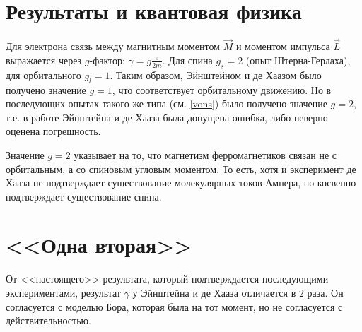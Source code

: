 \documentclass[a4paper]{article}
\begin{document}
\section*{Результаты и квантовая физика}
Для электрона связь между магнитным моментом $\vec{M}$ и моментом импульса $\vec{L}$ выражается через $g$-фактор: $\gamma=g\frac{e}{2m}$. Для спина $g_s=2$ (опыт Штерна-Герлаха), для орбитального $g_l=1$. Таким образом, Эйнштейном и де Хаазом было получено значение $g=1$, что соответствует орбитальному движению. Но в последующих опытах такого же типа (см. \ref*{vons}) было получено значение $g=2$, т.е. в работе Эйнштейна и де Хааза была допущена ошибка, либо неверно оценена погрешность.

Значение $g=2$ указывает на то, что магнетизм ферромагнетиков связан не с орбитальным, а со спиновым угловым моментом. То есть, хотя и эксперимент де Хааза не подтверждает существование молекулярных токов Ампера, но косвенно подтверждает существование спина.
\section*{<<Одна вторая>>}
От <<настоящего>> результата, который подтверждается последующими экспериментами, результат $\gamma$ у Эйнштейна и де Хааза отличается в 2 раза. Он согласуется с моделью Бора, которая была на тот момент, но не согласуется с действительностью.
\end{document}

